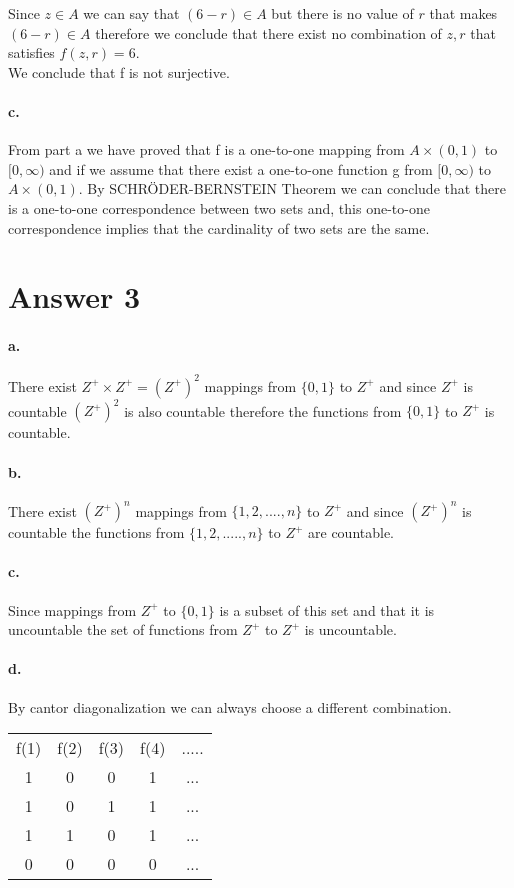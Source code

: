 \documentclass[11pt]{article}
\begin{document}
Since $z \in A$ we can say that $(6-r) \in A$ but there is no value of $r$ that makes $(6-r) \in A$ therefore we conclude that there exist no combination of $z,r$ that satisfies $f(z,r) = 6$.\\

We conclude that f is not surjective.\\

\paragraph{c.}
From part a we have proved that f is a one-to-one mapping from $A \times (0,1)$ to $[0,\infty)$ and if we assume that there exist a one-to-one function g from $[0,\infty)$ to $A \times (0,1)$. By SCHRÖDER-BERNSTEIN Theorem we can conclude that there is a one-to-one correspondence between two sets and, this one-to-one correspondence implies that the cardinality of two sets are the same.

\section*{Answer 3}

\paragraph{a.}
There exist $Z^+ \times Z^+ = (Z^+)^2$ mappings from $\{0,1\}$ to $Z^+$ and since $Z^+$ is countable $(Z^+)^2$ is also countable therefore the functions from $\{0,1\}$ to $Z^+$ is countable. 

\paragraph{b.}
There exist $(Z^+)^n$ mappings from $\{1,2,....,n\}$ to $Z^+$ and since $(Z^+)^n$ is countable the functions from $\{1,2,.....,n\}$ to $Z^+$ are countable.

\paragraph{c.}
Since mappings from  $Z^+$ to $\{0,1\}$ is a subset of this set and that it is uncountable the set of functions from $Z^+$ to $Z^+$ is uncountable.\\

\paragraph{d.}
By cantor diagonalization we can always choose a different combination. \\
\begin{tabular}{c c c c c}
     f(1) & f(2) & f(3) & f(4) & ..... \\
     1 & 0 & 0 & 1 & ... \\ 
     1 & 0 & 1 & 1 & ... \\ 
     1 & 1 & 0 & 1 & ... \\ 
     0 & 0 & 0 & 0 & ... \\ 
\end{tabular} \\\\
\end{document}
